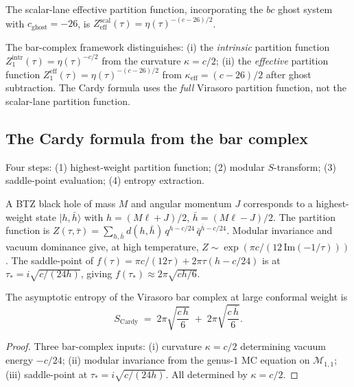 \documentclass[11pt]{article}
\newcommand{\cM}{\mathcal{M}}
\begin{document}
The scalar-lane effective partition function, incorporating the
$bc$ ghost system with $c_{\mathrm{ghost}} = -26$, is
$Z_{\mathrm{eff}}^{\mathrm{scal}}(\tau) = \eta(\tau)^{-(c-26)/2}$.

\begin{observation}
\label{obs:two-partition-functions-wn}
The bar-complex framework distinguishes:
(i) the \emph{intrinsic} partition function
$Z_1^{\mathrm{intr}}(\tau) = \eta(\tau)^{-c/2}$ from the
curvature $\kappa = c/2$;
(ii) the \emph{effective} partition function
$Z_1^{\mathrm{eff}}(\tau) = \eta(\tau)^{-(c-26)/2}$ from
$\kappa_{\mathrm{eff}} = (c-26)/2$ after ghost subtraction.
The Cardy formula uses the \emph{full} Virasoro partition
function, not the scalar-lane partition function.
\end{observation}

\subsection{The Cardy formula from the bar complex}
\label{subsec:btz-cardy-derivation}

Four steps: (1) highest-weight partition function; (2) modular
$S$-transform; (3) saddle-point evaluation; (4) entropy extraction.

A BTZ black hole of mass $M$ and angular momentum $J$ corresponds
to a highest-weight state $|h,\bar h\rangle$ with
$h = (M\ell + J)/2$, $\bar h = (M\ell - J)/2$.
The partition function is
$Z(\tau,\bar\tau) = \sum_{h,\bar h} d(h,\bar h)\,
q^{h - c/24}\,\bar q^{\bar h - c/24}$.
Modular invariance and vacuum dominance give, at high temperature,
$Z \sim \exp(\pi c/(12\,\mathrm{Im}(-1/\tau)))$.
The saddle-point of $f(\tau) = \pi c/(12\tau) + 2\pi\tau(h-c/24)$
is at $\tau_* = i\sqrt{c/(24h)}$, giving
$f(\tau_*) \approx 2\pi\sqrt{ch/6}$.

\begin{theorem}
\label{thm:btz-cardy-wn}
The asymptotic entropy of the Virasoro bar complex at large
conformal weight is
\begin{equation}\label{eq:btz-cardy-wn}
\boxed{
S_{\mathrm{Cardy}}
\;=\;
2\pi\sqrt{\frac{c\,h}{6}}
\;+\;
2\pi\sqrt{\frac{c\,\bar h}{6}}.
}
\end{equation}
\end{theorem}

\begin{proof}
Three bar-complex inputs: (i) curvature $\kappa = c/2$
determining vacuum energy $-c/24$; (ii) modular invariance
from the genus-$1$ MC equation on $\cM_{1,1}$; (iii)
saddle-point at $\tau_* = i\sqrt{c/(24h)}$.  All determined
by $\kappa = c/2$.
\end{proof}
\end{document}
